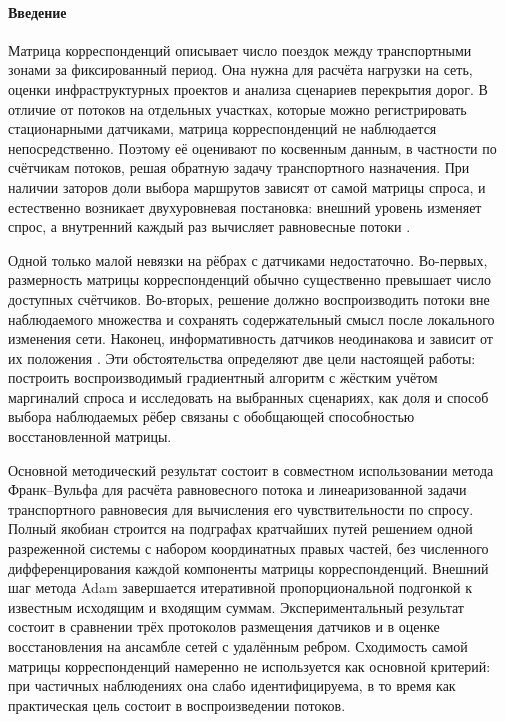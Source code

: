\documentclass{crm-article}
\begin{document}

\maketitle
{}
\numberparagraphs
\renewcommand{\newpar}{%
  \stepcounter{parno}\setcounter{subparno}{0}\theparno.~}

\paragraph{Введение}

Матрица корреспонденций описывает
число поездок между транспортными зонами за фиксированный период. Она нужна
для расчёта нагрузки на сеть, оценки инфраструктурных проектов и анализа
сценариев перекрытия дорог. В отличие от потоков на отдельных участках,
которые можно регистрировать стационарными датчиками, матрица корреспонденций не наблюдается
непосредственно. Поэтому её оценивают по косвенным данным, в частности по
счётчикам потоков, решая обратную задачу транспортного назначения. При наличии
заторов доли выбора маршрутов зависят от самой матрицы спроса, и естественно
возникает двухуровневая постановка: внешний уровень изменяет спрос, а
внутренний каждый раз вычисляет равновесные потоки
\cite{Yang1992,Mohanty2020,Castiglione2021}.

Одной только малой невязки на рёбрах с датчиками недостаточно. Во-первых,
размерность матрицы корреспонденций обычно существенно превышает число доступных счётчиков.
Во-вторых, решение должно воспроизводить потоки вне наблюдаемого множества и
сохранять содержательный смысл после локального изменения сети. Наконец,
информативность датчиков неодинакова и зависит от их положения
\cite{ZhouList2010,Dey2020}. Эти обстоятельства определяют две цели настоящей
работы: построить воспроизводимый градиентный алгоритм с жёстким учётом
маргиналий спроса и исследовать на выбранных сценариях, как доля и способ
выбора наблюдаемых рёбер связаны с обобщающей способностью восстановленной
матрицы.

Основной методический результат состоит в совместном использовании метода
Франк--Вульфа для расчёта равновесного потока и линеаризованной задачи
транспортного равновесия для вычисления его чувствительности по спросу.
Полный якобиан строится на подграфах кратчайших путей решением одной
разреженной системы с набором координатных правых частей, без численного
дифференцирования каждой компоненты матрицы корреспонденций. Внешний шаг метода
Adam завершается итеративной пропорциональной подгонкой к известным исходящим
и входящим суммам.
Экспериментальный результат состоит в сравнении
трёх протоколов размещения датчиков и в оценке восстановления на ансамбле
сетей с удалённым ребром. Сходимость самой матрицы корреспонденций намеренно не используется
как основной критерий: при частичных наблюдениях она слабо идентифицируема, в
то время как практическая цель состоит в воспроизведении потоков.
\end{document}
